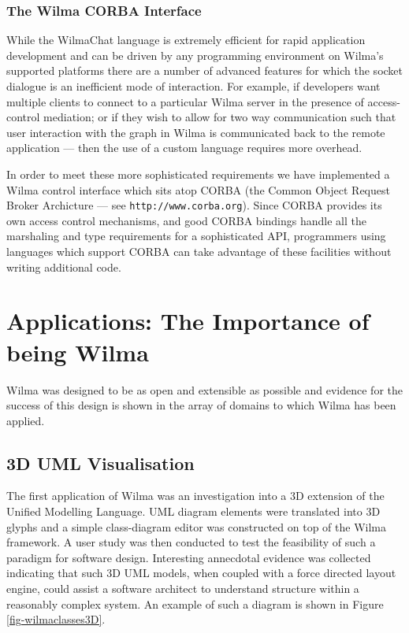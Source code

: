 \documentclass[runningheads]{cl2emult}
\newcommand{\url}[1]{{\small{\tt #1}}}
\begin{document}
\subsubsection{The Wilma CORBA Interface}

While the WilmaChat language is extremely efficient for rapid application
development and can be driven by any programming environment on Wilma's
supported platforms there are a number of advanced features for which the
socket dialogue is an inefficient mode of interaction.  For example, if
developers want multiple clients to connect to a particular Wilma server in
the presence of access-control mediation; or if they wish to allow for
two way communication such that user interaction with the graph in
Wilma is communicated back to the remote application --- then the use
of a custom language requires more overhead.

In order to meet these more sophisticated requirements we have implemented a
Wilma control interface which sits atop CORBA (the Common Object Request
Broker Archicture --- see \url{http://www.corba.org}).  Since CORBA provides
its own access control mechanisms, and good CORBA bindings handle all the
marshaling and type requirements for a sophisticated API, programmers using
languages which support CORBA can take advantage of these facilities without
writing additional code.

\section{Applications: The Importance of being Wilma}
\label{sec:results}
Wilma was designed to be as open and extensible as possible and
evidence for the success of this design is shown in the array of
domains to which Wilma has been applied.

\subsection{3D UML Visualisation} \label{sec:3duml}
The first application of Wilma was an investigation into a 3D
extension of the Unified Modelling Language\cite{dwyer013D-UML}.
UML diagram elements were translated into 3D glyphs and a simple
class-diagram editor was constructed on top of the Wilma framework.  A user study
was then conducted to test the feasibility of such a paradigm for
software design.  Interesting annecdotal evidence was collected
indicating that such 3D UML models, when coupled with a force directed
layout engine, could assist a software architect to understand structure
within a reasonably complex system.  An example of such a diagram is
shown in Figure \ref{fig-wilmaclasses3D}.
\end{document}
